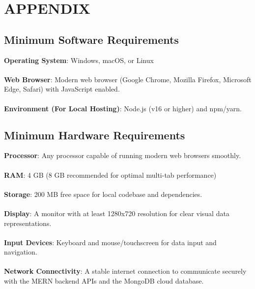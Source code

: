 \chapter{APPENDIX}

\section{Minimum Software Requirements}
\medskip
\textbf{Operating System}: Windows, macOS, or Linux
\\\\
\textbf{Web Browser}: Modern web browser (Google Chrome, Mozilla Firefox, Microsoft Edge, Safari) with JavaScript enabled.
\\\\
\textbf{Environment (For Local Hosting)}: Node.js (v16 or higher) and npm/yarn.

\section{Minimum Hardware Requirements}
\textbf{Processor}: Any processor capable of running modern web browsers smoothly.
\\\\
\textbf{RAM}: 4 GB (8 GB recommended for optimal multi-tab performance)
\\\\
\textbf{Storage}: 200 MB free space for local codebase and dependencies.
\\\\
\textbf{Display}: A monitor with at least 1280x720 resolution for clear visual data representations.
\\\\
\textbf{Input Devices}: Keyboard and mouse/touchscreen for data input and navigation.
\\\\
\textbf{Network Connectivity}: A stable internet connection to communicate securely with the MERN backend APIs and the MongoDB cloud database.
\\\\